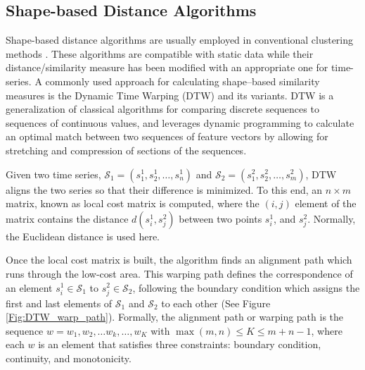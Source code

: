 \subsection{Shape-based Distance Algorithms}
\label{sec:ShapeBasedDistance}

Shape-based distance algorithms are usually employed in conventional clustering methods \cite{Pal2017}. These algorithms are compatible with static data while their distance/similarity measure has been modified with an appropriate one for time-series. A commonly used approach for calculating shape--based similarity measures is the Dynamic Time Warping (DTW) \cite{Sakoe1978} and its variants. DTW is a generalization of classical algorithms for comparing discrete sequences to sequences of continuous values, and leverages dynamic programming to calculate an optimal match between two sequences of feature vectors by allowing for stretching and compression of sections of the sequences. 

Given two time series, $\mathcal{S}_{1} =\left(s^{1}_{1}, s^{1}_{2}, \ldots, s^{1}_{n}\right)$ and $\mathcal{S}_{2} = \left(s^{2}_{1}, s^{2}_{2}, \ldots, s^{2}_{m}\right)$, DTW aligns the two series so that their difference is minimized. To this end, an $n \times m$ matrix, known as local cost matrix is computed, where the $(i, j)$ element of the matrix contains the distance $d(s^{1}_{i}, s^{2}_{j})$ between two points $s^{1}_{i}$, and $s^{2}_{j}$. Normally, the Euclidean distance is used here.

Once the local cost matrix is built, the algorithm finds an alignment path which runs through the low-cost area. This warping path defines the correspondence of an element $s^{1}_{i} \in \mathcal{S}_{1}$ to $s^{2}_{j} \in \mathcal{S}_{2}$, following the boundary condition which assigns the first and last elements of $\mathcal{S}_{1}$ and $\mathcal{S}_{2}$ to each other (See Figure \ref{Fig:DTW_warp_path}). Formally, the alignment path or warping path is the sequence $w = w_{1} , w_{2}, \ldots w_{k}, \ldots, w_{K}$ with $\max(m, n) \leq K \leq m + n-1$, where each $w$ is an element that satisfies three constraints: boundary condition, continuity, and monotonicity. 


